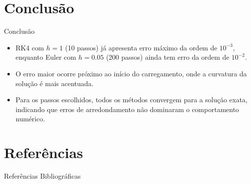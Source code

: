 \documentclass{beamer}
\begin{document}
\section{Conclusão}

\begin{frame}{Conclusão}
    \begin{itemize}
        \item RK4 com \(h=1\) (\num{10} passos) já apresenta erro máximo da ordem de \(10^{-3}\), enquanto Euler com \(h=0.05\) (200 passos) ainda tem erro da ordem de \(10^{-2}\).
        \item O erro maior ocorre próximo ao início do carregamento, onde a curvatura da solução é mais acentuada.
        \item Para os passos escolhidos, todos os métodos convergem para a solução exata, indicando que erros de arredondamento não dominaram o comportamento numérico.
    \end{itemize}
\end{frame}

\section{Referências}
    \begin{frame}{Referências Bibliográficas}
        \printbibliography
    \end{frame}
\end{document}
